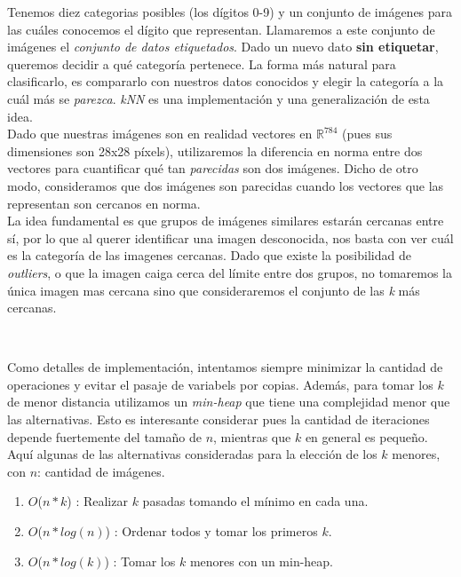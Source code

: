 Tenemos diez categorias posibles (los dígitos 0-9) y un conjunto de imágenes para las cuáles conocemos el dígito que representan. Llamaremos a este conjunto de imágenes el \textit{conjunto de datos etiquetados}. Dado un nuevo dato \textbf{sin etiquetar}, queremos decidir a qué categoría pertenece. La forma más natural para clasificarlo, es compararlo con nuestros datos conocidos y elegir la categoría a la cuál más se \textit{parezca}. \textit{kNN} es una implementación y una generalización de esta idea. \\

Dado que nuestras imágenes son en realidad vectores en $\mathbb{R}^{784}$ (pues sus dimensiones son 28x28 píxels), utilizaremos la diferencia en norma entre dos vectores para cuantificar qué tan \textit{parecidas} son dos imágenes. Dicho de otro modo, consideramos que dos imágenes son parecidas cuando los vectores que las representan son cercanos en norma. \\

La idea fundamental es que grupos de imágenes similares estarán cercanas entre sí, por lo que al querer identificar una imagen desconocida, nos basta con ver cuál es la categoría de las imagenes cercanas. Dado que existe la posibilidad de \textit{outliers}, o que la imagen caiga cerca del límite entre dos grupos, no tomaremos la única imagen mas cercana sino que consideraremos el conjunto de las \textit{k} más cercanas. \\



$ $\newline

Como detalles de implementación, intentamos siempre minimizar la cantidad de operaciones y evitar el pasaje de variabels por copias. Además, para tomar los $k$ de menor distancia utilizamos un \textit{min-heap} que tiene una complejidad menor que las alternativas. Esto es interesante considerar pues la cantidad de iteraciones depende fuertemente del tamaño de $n$, mientras que $k$ en general es pequeño.\\

Aquí algunas de las alternativas consideradas para la elección de los $k$ menores, con $n$: cantidad de imágenes.

\begin{enumerate}
\item $O$($n * k$) : Realizar $k$ pasadas tomando el mínimo en cada una.
\item $O$($n * log(n)$) : Ordenar todos y tomar los primeros $k$.
\item $O$($n * log(k)$) : Tomar los $k$ menores con un min-heap.
\end{enumerate}

